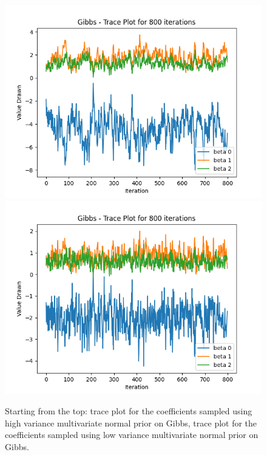 \documentclass{article}
\begin{document}
\begin{figure}[htp]
    \centering
    \includegraphics[scale=0.6]{images/trace_gibbs_multinorm_800_warmup_0_high.png}
    \includegraphics[scale=0.6]{images/trace_gibbs_multinorm_800_warmup_0_low.png}
    \caption{Starting from the top: trace plot for the coefficients sampled using high variance multivariate normal prior on Gibbs, trace plot for the coefficients sampled using low variance multivariate normal prior on Gibbs.}
    \label{fig:trace_3}
\end{figure}
\end{document}
